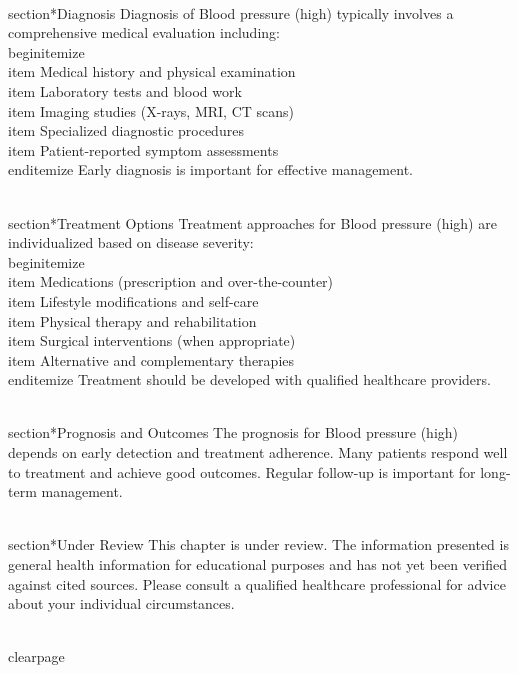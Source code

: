 \\section*{Diagnosis}
Diagnosis of Blood pressure (high) typically involves a comprehensive medical evaluation including:
\\begin{itemize}
  \\item Medical history and physical examination
  \\item Laboratory tests and blood work
  \\item Imaging studies (X-rays, MRI, CT scans)
  \\item Specialized diagnostic procedures
  \\item Patient-reported symptom assessments
\\end{itemize}
Early diagnosis is important for effective management.

\\section*{Treatment Options}
Treatment approaches for Blood pressure (high) are individualized based on disease severity:
\\begin{itemize}
  \\item Medications (prescription and over-the-counter)
  \\item Lifestyle modifications and self-care
  \\item Physical therapy and rehabilitation
  \\item Surgical interventions (when appropriate)
  \\item Alternative and complementary therapies
\\end{itemize}
Treatment should be developed with qualified healthcare providers.

\\section*{Prognosis and Outcomes}
The prognosis for Blood pressure (high) depends on early detection and treatment adherence. Many patients respond well to treatment and achieve good outcomes. Regular follow-up is important for long-term management.

\\section*{Under Review}
This chapter is under review. The information presented is general health information for educational purposes and has not yet been verified against cited sources. Please consult a qualified healthcare professional for advice about your individual circumstances.

\\clearpage
